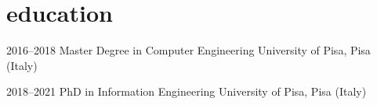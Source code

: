 \section{education}

\begin{entrylist}

\entry
{2016--2018}
{Master Degree {\normalfont in Computer Engineering}}
{University of Pisa, Pisa (Italy)}

\entry
{2018--2021}
{PhD {\normalfont in Information Engineering}}
{University of Pisa, Pisa (Italy)}

\end{entrylist}


